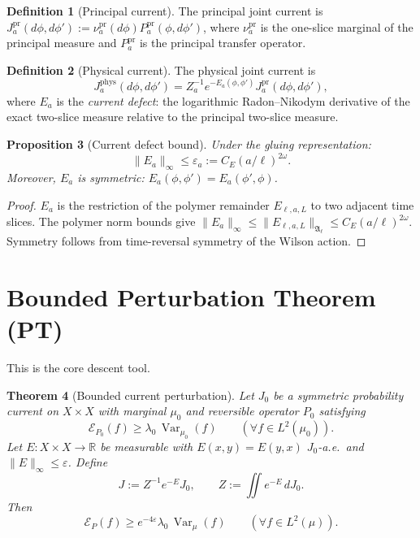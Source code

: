 \documentclass[12pt]{article}
\theoremstyle{plain}
\newtheorem{theorem}{Theorem}[section]
\newtheorem{proposition}[theorem]{Proposition}
\theoremstyle{definition}
\newtheorem{definition}[theorem]{Definition}
\numberwithin{equation}{section}
\newcommand{\R}{\mathbb{R}}
\newcommand{\fA}{\mathfrak{A}}
\newcommand{\Var}{\operatorname{Var}}
\newcommand{\pr}{\mathrm{pr}}
\newcommand{\phys}{\mathrm{phys}}
\begin{document}
\begin{definition}[Principal current]
The principal joint current is $J_a^{\pr}(d\phi,d\phi'):=\nu_a^{\pr}(d\phi)P_a^{\pr}(\phi,d\phi')$, where $\nu_a^{\pr}$ is the one-slice marginal of the principal measure and $P_a^{\pr}$ is the principal transfer operator.
\end{definition}

\begin{definition}[Physical current]
The physical joint current is
\begin{equation}
J_a^{\phys}(d\phi,d\phi') = Z_a^{-1}e^{-E_a(\phi,\phi')}J_a^{\pr}(d\phi,d\phi'),
\end{equation}
where $E_a$ is the \emph{current defect}: the logarithmic Radon--Nikodym derivative of the exact two-slice measure relative to the principal two-slice measure.
\end{definition}

\begin{proposition}[Current defect bound]\label{prop:currentdefect}
Under the gluing representation:
\begin{equation}
\|E_a\|_\infty \leq \varepsilon_a := C_E(a/\ell)^{2\omega}.
\end{equation}
Moreover, $E_a$ is symmetric: $E_a(\phi,\phi')=E_a(\phi',\phi)$.
\end{proposition}

\begin{proof}
$E_a$ is the restriction of the polymer remainder $E_{\ell,a,L}$ to two adjacent time slices.  The polymer norm bounds give $\|E_a\|_\infty\leq\|E_{\ell,a,L}\|_{\fA_\ell}\leq C_E(a/\ell)^{2\omega}$.  Symmetry follows from time-reversal symmetry of the Wilson action.
\end{proof}

\section{Bounded Perturbation Theorem (PT)}\label{sec:PT}

This is the core descent tool.

\begin{theorem}[Bounded current perturbation]\label{thm:PT}
Let $J_0$ be a symmetric probability current on $X\times X$ with marginal $\mu_0$ and reversible operator $P_0$ satisfying
\begin{equation}
\mathcal{E}_{P_0}(f) \geq \lambda_0\,\Var_{\mu_0}(f)\qquad(\forall f\in L^2(\mu_0)).
\end{equation}
Let $E:X\times X\to\R$ be measurable with $E(x,y)=E(y,x)$ $J_0$-a.e.\ and $\|E\|_\infty\leq\varepsilon$.  Define
\begin{equation}
J := Z^{-1}e^{-E}J_0,\qquad Z:=\iint e^{-E}\,dJ_0.
\end{equation}
Then
\begin{equation}
\boxed{\mathcal{E}_P(f) \geq e^{-4\varepsilon}\lambda_0\,\Var_\mu(f)\qquad(\forall f\in L^2(\mu)).}
\end{equation}
\end{theorem}
\end{document}

